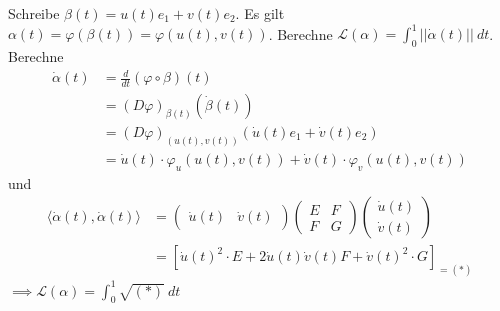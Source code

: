 \documentclass[../main.tex]{subfiles}
\begin{document}
Schreibe $\beta (t) = u(t)e_1 + v(t)e_2$. Es gilt $\alpha(t) = \varphi(\beta(t))=\varphi(u(t),v(t))$.
Berechne $\mathcal{L}(\alpha)= \int _0^1 ||\dot{\alpha}(t)|| \ dt$.
Berechne \begin{align*}
    \dot{\alpha}(t) &= \frac{d}{dt}(\varphi \circ \beta)(t) \\
    &= (D\varphi)_{\beta(t)}(\dot{\beta}(t)) \\
    &= (D\varphi)_{(u(t), v(t))}(\dot{u}(t)e_1 + \dot{v}(t)e_2) \\
    &= \dot{u}(t) \cdot \varphi_u(u(t),v(t))+\dot{v}(t) \cdot \varphi_v(u(t),v(t))
\end{align*} und 
\begin{align*}
    \langle \dot{\alpha}(t), \dot{\alpha}(t) \rangle &= \begin{pmatrix}
        \dot{u}(t) & \dot{v}(t)
    \end{pmatrix}\begin{pmatrix}
        E & F \\ F & G
    \end{pmatrix}\begin{pmatrix}
        \dot{u}(t) \\ \dot{v}(t)
    \end{pmatrix} \\
    &= \left[ \dot{u}(t)^2 \cdot E + 2\dot{u}(t)\dot{v}(t)F + \dot{v}(t)^2\cdot G \right]_{=(*)}
\end{align*}
$\implies \mathcal{L} (\alpha) = \int _0^1 \sqrt{(*)} \ dt$
\end{document}
